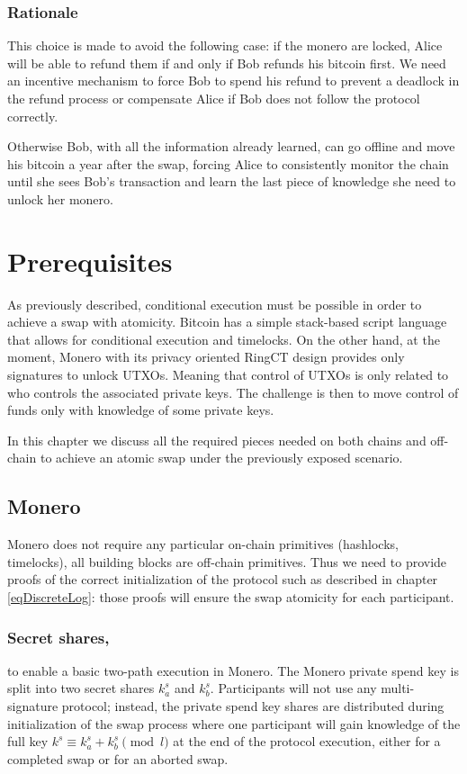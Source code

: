 \documentclass{llncs}
\begin{document}
\subsubsection{Rationale}
\label{worstCaseRationale}
This choice is made to avoid the following case: if the monero are locked, Alice will be able to refund them if and only if Bob refunds his bitcoin first. We need an incentive mechanism to force Bob to spend his refund to prevent a deadlock in the refund process or compensate Alice if Bob does not follow the protocol correctly.

Otherwise Bob, with all the information already learned, can go offline and move his bitcoin a year after the swap, forcing Alice to consistently monitor the chain until she sees Bob's transaction and learn the last piece of knowledge she need to unlock her monero.

\section{Prerequisites}
\label{prerequisites}
As previously described, conditional execution must be possible in order to achieve a swap with atomicity. Bitcoin has a simple stack-based script language that allows for conditional execution and timelocks. On the other hand, at the moment, Monero with its privacy oriented RingCT design provides only signatures to unlock UTXOs. Meaning that control of UTXOs is only related to who controls the associated private keys. The challenge is then to move control of funds only with knowledge of some private keys.

In this chapter we discuss all the required pieces needed on both chains and off-chain to achieve an atomic swap under the previously exposed scenario.

\subsection{Monero}
Monero does not require any particular on-chain primitives (hashlocks, timelocks), all building blocks are off-chain primitives. Thus we need to provide proofs of the correct initialization of the protocol such as described in chapter \ref{eqDiscreteLog}: those proofs will ensure the swap atomicity for each participant.

\subsubsection{Secret shares,}
to enable a basic two-path execution in Monero. The Monero private spend key is split into two secret shares $k^s_a$ and $k^s_b$. Participants will not use any multi-signature protocol; instead, the private spend key shares are distributed during initialization of the swap process where one participant will gain knowledge of the full key $k^s \equiv k^s_a + k^s_b \pmod l$ at the end of the protocol execution, either for a completed swap or for an aborted swap.
\end{document}
